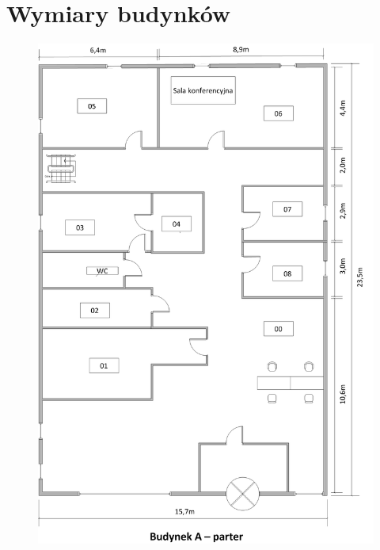 \documentclass{report}
\begin{document}
\section{Wymiary budynków}
\begin{figure}[H]
  \centering
      \includegraphics[width=\textwidth]{./obrazki/plany_wew/a0.png}
\end{figure}
\end{document}
